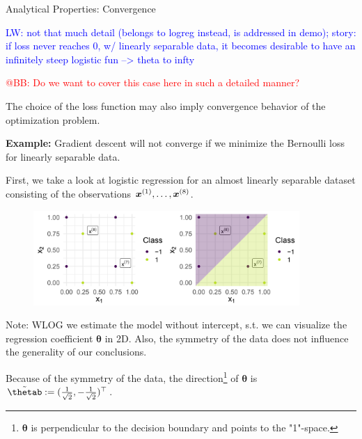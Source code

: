 
\begin{vbframe}{Analytical Properties: Convergence}

\textcolor{blue}{LW: not that much detail (belongs to logreg instead, is addressed in demo); story: if loss never reaches 0, w/ linearly separable data, it becomes desirable to have an infinitely steep logistic fun --> theta to infty}

\textcolor{red}{@BB: Do we want to cover this case here in such a detailed manner? }

The choice of the loss function may also imply convergence behavior of the optimization problem. 

\vspace*{0.2cm}

\textbf{Example: } Gradient descent will not converge if we minimize the Bernoulli loss for linearly separable data. 

\vspace*{0.2cm}

First, we take a look at logistic regression for an almost linearly separable dataset consisting of the observations $\bm{x}^{(1)}, \dots, \bm{x}^{(8)}$.
\vfill

\begin{figure}
\includegraphics[width=0.9\textwidth]{figure_man/undet-problem01.png}\\
\end{figure}


Note: WLOG we estimate the
model without intercept, s.t. we can visualize the regression coefficient 
$\bm{\theta}$ in 2D. Also, the symmetry of the data does not influence the generality of our conclusions.

\vspace*{0.2cm}

Because of the symmetry of the data, the direction\footnote[frame]{$\bm{\theta}$ is perpendicular to the decision boundary and points to the "1"-space.} of $\bm{\theta}$ is $\tilde\thetab := (\frac{1}{\sqrt{2}}, -\frac{1}{\sqrt{2}})^\top$.


\end{vbframe}
